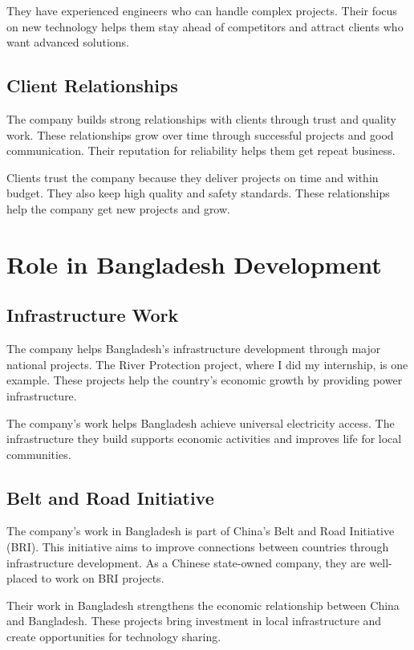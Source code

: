 They have experienced engineers who can handle complex projects. Their focus on new technology helps them stay ahead of competitors and attract clients who want advanced solutions.

\subsection{Client Relationships}
The company builds strong relationships with clients through trust and quality work. These relationships grow over time through successful projects and good communication. Their reputation for reliability helps them get repeat business.

Clients trust the company because they deliver projects on time and within budget. They also keep high quality and safety standards. These relationships help the company get new projects and grow.

\section{Role in Bangladesh Development}

\subsection{Infrastructure Work}
The company helps Bangladesh's infrastructure development through major national projects. The River Protection project, where I did my internship, is one example. These projects help the country's economic growth by providing power infrastructure.

The company's work helps Bangladesh achieve universal electricity access. The infrastructure they build supports economic activities and improves life for local communities.

\subsection{Belt and Road Initiative}
The company's work in Bangladesh is part of China's Belt and Road Initiative (BRI). This initiative aims to improve connections between countries through infrastructure development. As a Chinese state-owned company, they are well-placed to work on BRI projects.

Their work in Bangladesh strengthens the economic relationship between China and Bangladesh. These projects bring investment in local infrastructure and create opportunities for technology sharing.

